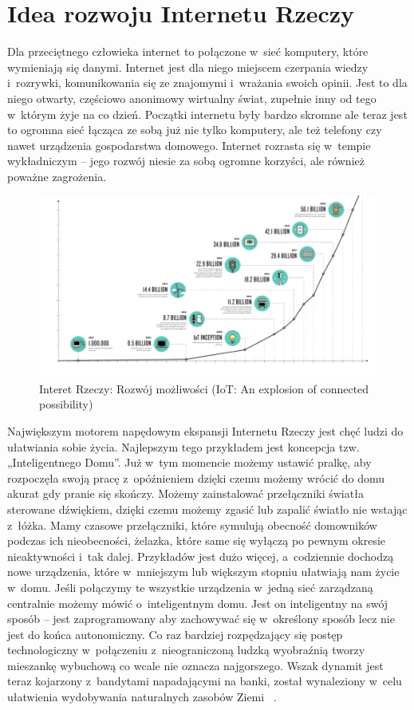 \documentclass{xmgr}
\begin{document}
\section{Idea rozwoju Internetu Rzeczy}
	Dla przeciętnego człowieka internet to połączone w~sieć komputery, które wymieniają się danymi. Internet jest dla niego miejscem czerpania wiedzy i~rozrywki, komunikowania się ze znajomymi i~wrażania swoich opinii. Jest to dla niego otwarty, częściowo anonimowy wirtualny świat, zupełnie inny od tego w~którym żyje na co dzień. Początki internetu były bardzo skromne ale teraz jest to ogromna sieć łącząca ze sobą już nie tylko komputery, ale też telefony czy nawet urządzenia gospodarstwa domowego. Internet rozrasta się w~tempie wykładniczym – jego rozwój niesie za sobą ogromne korzyści, ale również poważne zagrożenia.
\begin{figure}[h]
\centering
\includegraphics[width=12cm]{m_exp}
\caption{Interet Rzeczy: Rozwój możliwości (IoT: An explosion of connected possibility)~ \cite{Nsr:2015:CMC}}
\label{fig:exp}
\end{figure} 
	Największym motorem napędowym ekspansji Internetu Rzeczy jest chęć ludzi do ułatwiania sobie życia. Najlepszym tego przykładem jest koncepcja tzw. „Inteligentnego Domu”. Już w~tym momencie możemy ustawić pralkę, aby rozpoczęła swoją pracę z~opóźnieniem dzięki czemu możemy wrócić do domu akurat gdy pranie się skończy. Możemy zainstalować przełączniki światła sterowane dźwiękiem, dzięki czemu możemy zgasić lub zapalić światło nie wstając z~łóżka. Mamy czasowe przełączniki, które symulują obecność domowników podczas ich nieobecności, żelazka, które same się wyłączą po pewnym okresie nieaktywności i~tak dalej. Przykładów jest dużo więcej, a~codziennie dochodzą nowe urządzenia, które w~mniejszym lub większym stopniu ułatwiają nam życie w~domu. Jeśli połączymy te wszystkie urządzenia w~jedną sieć zarządzaną centralnie możemy mówić o~inteligentnym domu. Jest on inteligentny na swój sposób – jest zaprogramowany aby zachowywać się w~określony sposób lecz nie jest do końca autonomiczny. Co raz bardziej rozpędzający się postęp technologiczny w~połączeniu z~nieograniczoną ludzką wyobraźnią tworzy mieszankę wybuchową co wcale nie oznacza najgorszego. Wszak dynamit jest teraz kojarzony z~bandytami napadającymi na banki, został wynaleziony w~celu ułatwienia wydobywania naturalnych zasobów Ziemi~ \cite{Rethinking}.
\end{document}
